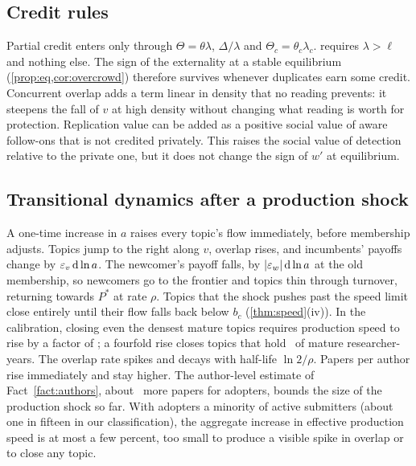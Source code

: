 \subsection{Credit rules}

Partial credit enters only through $\Theta=\theta\lambda$, $\Delta/\lambda$ and
$\Theta_c=\theta_c\lambda_c$.  requires $\lambda>\ell$ and nothing else.
The sign of the externality at a stable equilibrium
(\cref{prop:eq,cor:overcrowd}) therefore survives whenever duplicates earn some
credit. Concurrent overlap adds a term linear in density that no reading
prevents: it steepens the fall of $v$ at high density without changing what
reading is worth for protection. Replication value can be added as a positive
social value of aware follow-ons that is not credited privately. This raises
the social value of detection relative to the private one, but it does not
change the sign of $w'$ at equilibrium.

\subsection{Transitional dynamics after a production shock}\label{app:transition}

A one-time increase in $a$ raises every topic's flow immediately, before
membership adjusts. Topics jump to the right along $v$, overlap rises, and
incumbents' payoffs change by $\varepsilon_v\,\mathrm{d}\ln a$. The newcomer's payoff falls, by
$|\varepsilon_w|\,\mathrm{d}\ln a$ at the old membership, so newcomers go to the frontier and
topics thin through turnover, returning towards $P^*$ at rate $\rho$. Topics
that the shock pushes past the speed limit close entirely until their flow
falls back below $b_c$ (\cref{thm:speed}(iv)). In the calibration, closing even
the densest mature topics requires production speed to rise by a factor of
\calCloseAlpha; a fourfold rise closes topics that hold \calCloseFour\ of
mature researcher-years. The overlap rate spikes and decays with half-life
$\ln2/\rho$. Papers per author rise immediately and stay higher. The
author-level estimate of Fact~\ref{fact:authors}, about \empLLMallPct\ more
papers for adopters, bounds the size of the production shock so far. With adopters a minority of
active submitters (about one in fifteen in our classification), the aggregate
increase in effective production speed is at most a few percent, too small to
produce a visible spike in overlap or to close any topic.
